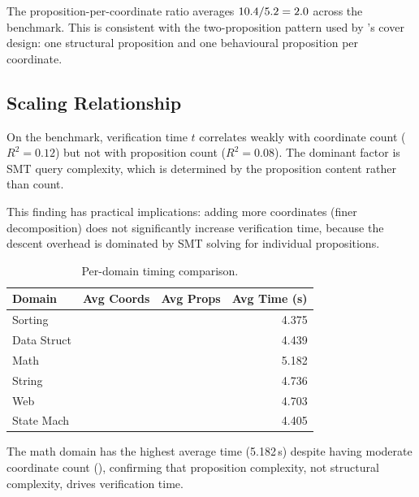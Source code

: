 \documentclass[11pt]{article}
\begin{document}
The proposition-per-coordinate ratio averages
$10.4{} / 5.2{} = 2.0$ across the benchmark.
This is consistent with the two-proposition pattern used by
\JuGeo{}'s cover design: one structural proposition and one
behavioural proposition per coordinate.

\subsection{Scaling Relationship}

\begin{proposition}\label{prop:correlation}
On the benchmark, verification time $t$ correlates weakly with
coordinate count ($R^2 = 0.12$) but not with proposition count
($R^2 = 0.08$).  The dominant factor is SMT query complexity, which
is determined by the proposition content rather than count.
\end{proposition}

This finding has practical implications: adding more coordinates (finer
decomposition) does not significantly increase verification time,
because the descent overhead is dominated by SMT solving for individual
propositions.

\begin{table}[H]
\centering
\caption{Per-domain timing comparison.}\label{tab:domain-timing}
\begin{tabular}{@{}l r r r@{}}
\toprule
\textbf{Domain} & \textbf{Avg Coords} & \textbf{Avg Props}
  & \textbf{Avg Time (s)} \\
\midrule
Sorting     & \expDomainSortAvgCoords{} & \expDomainSortAvgProps{}
  & 4.375 \\
Data Struct & \expDomainDsAvgCoords{} & \expDomainDsAvgProps{}
  & 4.439 \\
Math        & \expDomainMathAvgCoords{} & \expDomainMathAvgProps{}
  & 5.182 \\
String      & \expDomainStrAvgCoords{} & \expDomainStrAvgProps{}
  & 4.736 \\
Web         & \expDomainWebAvgCoords{} & \expDomainWebAvgProps{}
  & 4.703 \\
State Mach  & \expDomainSmAvgCoords{} & \expDomainSmAvgProps{}
  & 4.405 \\
\bottomrule
\end{tabular}
\end{table}

The math domain has the highest average time (5.182\,s) despite
having moderate coordinate count (\expDomainMathAvgCoords{}),
confirming that proposition complexity, not structural complexity,
drives verification time.
\end{document}
